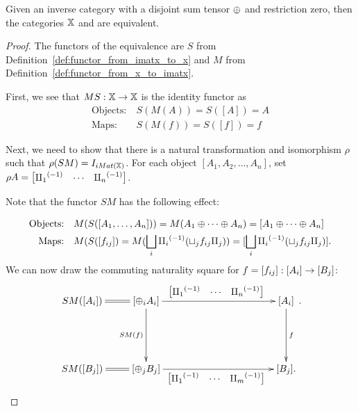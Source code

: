 \begin{proposition}\label{pro:x_and_imatx_are_equivalent}
  Given an inverse category \X with a disjoint sum tensor $\oplus$ and restriction zero, then the
  categories $\mathbb{X}$ and \imatx are equivalent.
\end{proposition}
\begin{proof}
  The functors of the equivalence are $S$ from Definition~\ref{def:functor_from_imatx_to_x} and
  $M$ from Definition~\ref{def:functor_from_x_to_imatx}.

  First, we see that $M S:\mathbb{X} \to \mathbb{X}$ is the identity functor as
  \begin{align*}
    \text{Objects:}\ &S(M(A)) = S([A]) = A\\
    \text{Maps:}\ &S(M(f)) = S([f]) = f
  \end{align*}

  Next, we need to show that there is a natural transformation and isomorphism $\rho$ such that
  $\rho(S M) = I_{iMat({\mathbb{X}})}$. For each object $[A_1,A_2,\ldots,A_n]$, set
  $\rho A = \begin{bmatrix}{\amalg_{1}}^{(-1)}& \cdots &{\amalg_{n}}^{(-1)}\end{bmatrix}$.

  Note that the functor $S M$ has the following effect:

  \begin{align*}
    \text{Objects:}\quad &M(S([A_1,\ldots, A_n])) = M(A_1\oplus\cdots\oplus A_n) =
      [A_1\oplus\cdots\oplus A_n]\\
    \text{Maps:}\quad &M(S([f_{ij}]) = M(\bigsqcup_i {\amalg_{i}}^{(-1)} (\sqcup_j f_{ij} \amalg_{j}))
      = [\bigsqcup_i {\amalg_{i}}^{(-1)} (\sqcup_j f_{ij} \amalg_{j})].
  \end{align*}
  We can now draw the commuting naturality square for $f=[f_{ij}]:[A_i]\to [B_j]$:
  \[
    \xymatrix{
      SM([A_i]) \ar@{=}[r] & [\+_i A_i]
          \ar[rrrr]^{\begin{bmatrix}\icpa& \cdots &\icp{n}\end{bmatrix}}
          \ar[dd]_{SM(f)}
          & &&& [A_i] \ar[dd]^{f}\\
        &&&&&  \\
      SM([B_j]) \ar@{=}[r] & [\+_j B_j]
          \ar[rrrr]_{\begin{bmatrix}\icpa& \cdots &\icp{m}\end{bmatrix}}
          & &&& [B_j]. \\
    }.
  \]


\end{proof}
